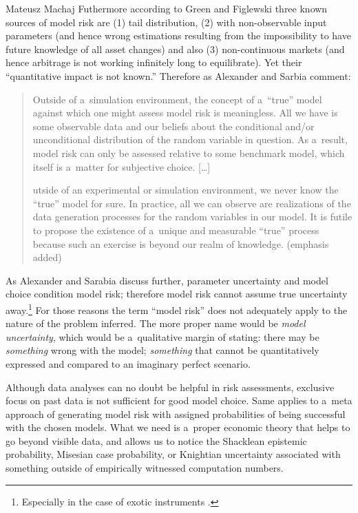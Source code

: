 \begin{artengenv}{Mateusz Machaj}
Futhermore according to Green and Figlewski three known sources of model risk are (1) tail distribution, (2) with non-observable input parameters (and hence wrong estimations resulting from the impossibility to have future knowledge of all asset changes) and also (3) non-continuous markets (and hence arbitrage is not working infinitely long to equilibrate). Yet their ``quantitative impact is not known.'' Therefore as Alexander and Sarbia 
\parencite*[][pp.1295–1296]{alexander_quantile_2012} %
 comment:
\begin{quote}
Outside of a~simulation environment, the concept of a~``true'' model against which one might assess model risk is meaningless. All we have is some observable data and our beliefs about the conditional and/or unconditional distribution of the random variable in question. As a~result, model risk can only be assessed relative to some benchmark model, which itself is a~matter for subjective choice. […]

\noindent [O]utside of an experimental or simulation environment, we never know the ``true'' model for sure. In practice, all we can observe are realizations of the data generation processes for the random variables in our model. It is futile to propose the existence of a~unique and measurable ``true'' process because such an exercise is beyond our realm of knowledge. (emphasis added)
\end{quote}



As Alexander and Sarabia discuss further, parameter uncertainty and model choice condition model risk; therefore model risk cannot assume true uncertainty away.\footnote{Especially in the case of exotic instruments 
\parencite[][p.298]{hull_methodology_2002}.%
} For those reasons the term ``model risk'' does not adequately apply to the nature of the problem inferred. The more proper name would be \textit{model uncertainty}, which would be a~qualitative margin of stating: there may be \textit{something} wrong with the model; \textit{something} that cannot be quantitatively expressed and compared to an imaginary perfect scenario.



Although data analyses can no doubt be helpful in risk assessments, exclusive focus on past data is not sufficient for good model choice. Same applies to a~meta approach of generating model risk with assigned probabilities of being successful with the chosen models. What we need is a~proper economic theory that helps to go beyond visible data, and allows us to notice the Shacklean epistemic probability, Misesian case probability, or Knightian uncertainty associated with something outside of empirically witnessed computation numbers.




\end{artengenv}
